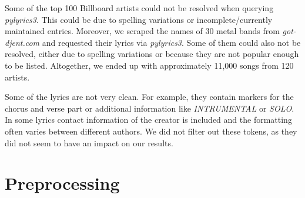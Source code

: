 \documentclass[10pt,a4paper]{article}
\begin{document}
	Some of the top 100 Billboard artists could not be resolved when querying \textit{pylyrics3}. This could be due to spelling variations or incomplete/currently maintained entries. Moreover, we scraped the names of 30 metal bands from \textit{got-djent.com} and requested their lyrics via \textit{pylyrics3}. Some of them could also not be resolved, either due to spelling variations or because they are not popular enough to be listed. Altogether, we ended up with approximately 11,000 songs from 120 artists.

	
	Some of the lyrics are not very clean. For example, they contain markers for the chorus and verse part or additional information like \textit{INTRUMENTAL} or \textit{SOLO}. In some lyrics contact information of the creator is included and the formatting often varies between different authors. We did not filter out these tokens, as they did not seem to have an impact on our results.
	

	\section{Preprocessing}	
	\label{sec:preprocessing}
	
\end{document}
